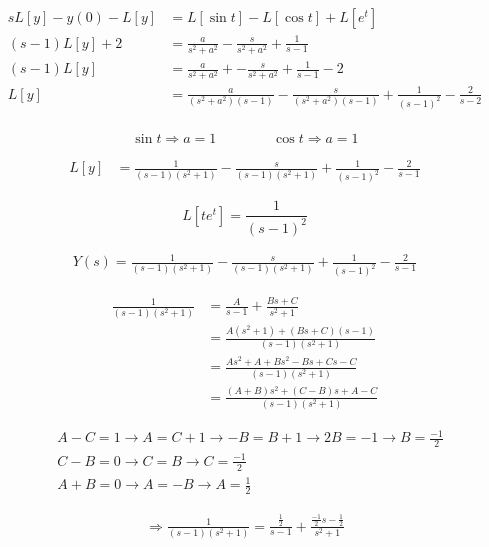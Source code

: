 \documentclass[12pt]{book}
\begin{document}
\begin{align*}
sL[y] - y(0) - L[y] &= L[\sin{t}] - L[\cos{t}] + L[e^{t}] \\
(s-1) L [y] + 2 &= \frac{a}{s^{2} + a^{2}} - \frac{s}{s^{2} + a^{2}} + \frac{1}{s-1} \\
(s-1) L [y] &= \frac{a}{s^{2} + a^{2}} + - \frac{s}{s^{2} + a^{2}} + \frac{1}{s-1} - 2 \\
L [y] &= \frac{a}{(s^{2} + a^{2})(s-1)} - \frac{s}{(s^{2} + a^{2})(s-1)} + \frac{1}{(s-1)^{2}} - \frac{2}{s-2} \\
\end{align*}

\begin{tcolorbox}
$$
\sin{t} \Rightarrow a = 1 \qquad \qquad \cos{t} \Rightarrow a = 1
$$
\end{tcolorbox}


\begin{align*}
L[y] &= \frac{1}{(s-1)(s^{2}+1)} - \frac{s}{(s-1)(s^{2}+1)} + \frac{1}{(s-1)^{2}} - \frac{2}{s-1}
\end{align*}

\begin{tcolorbox}
$$
L[te^{t}] = \frac{1}{(s-1)^{2}}
$$
\end{tcolorbox}


\begin{align*}
Y(s) = \frac{1}{(s-1)(s^{2}+1)} - \frac{s}{(s-1)(s^{2}+1)} + \frac{1}{(s-1)^{2}} - \frac{2}{s-1}
\end{align*}


\begin{align*}
\frac{1}{(s-1)(s^{2}+1)} &= \frac{A}{s-1} + \frac{Bs + C}{s^{2} + 1} \\
&= \frac{A(s^{2}+1) + (Bs + C)(s-1)}{(s-1)(s^{2}+1)} \\
&= \frac{As^{2} + A + Bs^{2} - Bs + Cs - C}{(s-1)(s^{2}+1)} \\
&= \frac{(A+B)s^{2} + (C-B)s + A - C}{(s-1)(s^{2}+1)}
\end{align*}


\begin{align*}
&A - C = 1 \to A = C + 1 \to - B = B + 1 \to 2B = -1 \to B = \frac{-1}{2} \\
&C - B = 0 \to C = B \to C = \frac{-1}{2} \\ 
&A + B = 0 \to A = -B \to A = \frac{1}{2} 
\end{align*}

\begin{align*}
\Rightarrow \frac{1}{(s-1)(s^{2}+1)} = \frac{\frac{1}{2}}{s-1} + \frac{\frac{-1}{2} s - \frac{1}{2}}{s^{2} + 1}
\end{align*}
\end{document}
